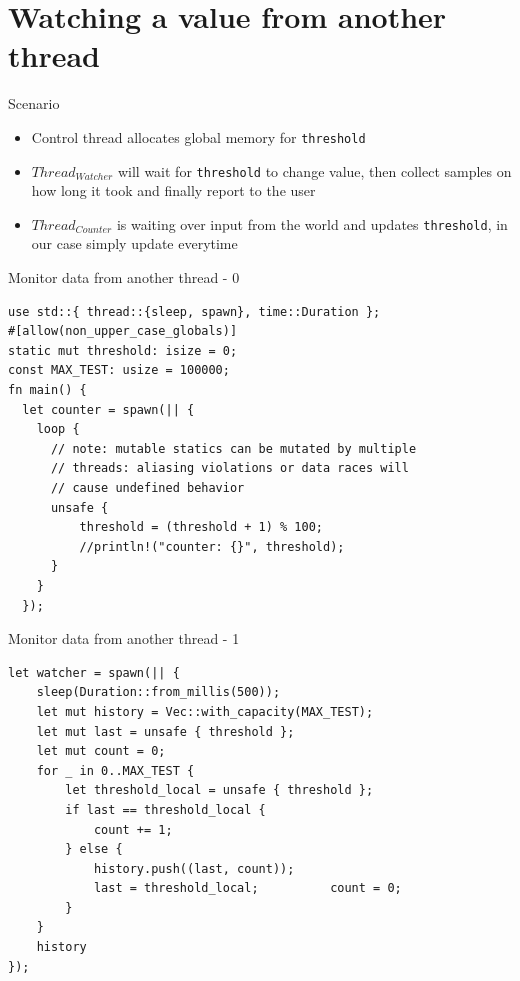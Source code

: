 \documentclass[10pt,aspectratio=169]{beamer}
\begin{document}
\section{Watching a value from another thread}

\begin{frame}{Scenario}
    \begin{itemize}
        \item Control thread allocates global memory for \texttt{threshold}
        \item $Thread_{Watcher}$ will wait for \texttt{threshold} to change value, then collect samples on how long it took
            and finally report to the user
        \item $Thread_{Counter}$ is waiting over input from the world and updates \texttt{threshold}, 
                in our case simply update everytime
    \end{itemize}
\end{frame}

\begin{frame}[fragile]{Monitor data from another thread - 0}
\begin{verbatim}
use std::{ thread::{sleep, spawn}, time::Duration };
#[allow(non_upper_case_globals)]
static mut threshold: isize = 0;
const MAX_TEST: usize = 100000;
fn main() {
  let counter = spawn(|| {
    loop {
      // note: mutable statics can be mutated by multiple 
      // threads: aliasing violations or data races will 
      // cause undefined behavior
      unsafe {
          threshold = (threshold + 1) % 100;
          //println!("counter: {}", threshold);
      }
    }
  });
\end{verbatim}
\end{frame}

\begin{frame}[fragile]{Monitor data from another thread - 1}
\begin{verbatim}
let watcher = spawn(|| {
    sleep(Duration::from_millis(500));
    let mut history = Vec::with_capacity(MAX_TEST);
    let mut last = unsafe { threshold };
    let mut count = 0;
    for _ in 0..MAX_TEST {
        let threshold_local = unsafe { threshold };
        if last == threshold_local {
            count += 1;
        } else {
            history.push((last, count));
            last = threshold_local;          count = 0;
        }
    }
    history
});
\end{verbatim}
\end{frame}
\end{document}
